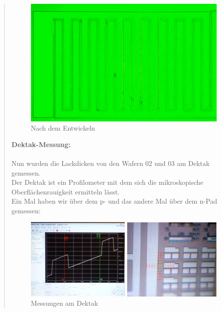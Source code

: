 \begin{quote}
    		\begin{figure}[H]
				\hspace{3 cm}
                  \includegraphics[scale=0.9, trim = 0cm 0cm 0cm 0cm,clip]
                	{./HerstellungBilder/Mikroskopbild3.png}
                  \caption{Nach dem Entwickeln}
                \label{fig:nachentwickelnwaf}
            \end{figure}

    		\vspace{2em}

    		\textbf{Dektak-Messung:}\\
			\\
			Nun wurden die Lackdicken von den Wafern 02 und 03 am Dektak
			gemessen.\\
			Der Dektak ist ein Profilometer mit dem sich die mikroskopische
			Oberflächenrauigkeit ermitteln lässt.\\
			Ein Mal haben wir über dem p- und das andere Mal über dem n-Pad
			gemessen:\\

			\vspace{2em}

    		\begin{figure}[H]
				\hspace{-1.5 cm}
                  \includegraphics[scale=1, trim = 0cm 0cm 0cm 0cm,clip]
                	{./HerstellungBilder/MessungenamDektak.png}
                  \caption{Messungen am Dektak}
                \label{fig:Dektak}
            \end{figure}


\end{quote}
